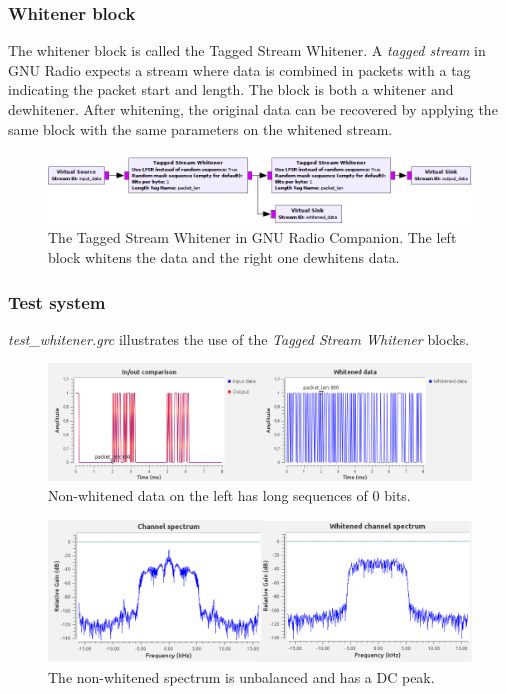 \subsubsection{Whitener block}

The whitener block is called the Tagged Stream Whitener. A \textit{tagged stream} in GNU Radio expects a stream where data is combined in packets with a tag indicating the packet start and length. The block is both a whitener and dewhitener. After whitening, the original data can be recovered by applying the same block with the same parameters on the whitened stream.

\begin{figure}[H]
    \centering
    \includegraphics[width=1\textwidth]{img_commchain/whitener_chain.png}
    \caption{The Tagged Stream Whitener in GNU Radio Companion. The left block whitens the data and the right one dewhitens data.}
    \label{fig:whitener_data}
\end{figure}


\subsubsection{Test system}
\textit{test\_whitener.grc} illustrates the use of the \textit{Tagged Stream Whitener} blocks.



\begin{figure}[H]
    \centering
    \includegraphics[width=1\textwidth]{img_commchain/whitener.png}
    \caption{Non-whitened data on the left has long sequences of 0 bits. }
    \label{fig:whitener_data}
\end{figure}

\begin{figure}[H]
    \centering
    \includegraphics[width=1\textwidth]{img_commchain/whitened_spectrum.png}
    \caption{The non-whitened spectrum is unbalanced and has a DC peak. }
    \label{fig:whitener_spectrum}
\end{figure}




